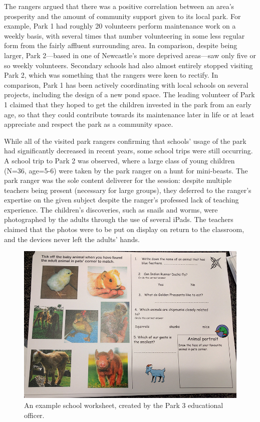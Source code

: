 The rangers argued that there was a positive correlation between an area’s prosperity and the amount of community support given to its local park. For example, Park 1 had roughly 20 volunteers perform maintenance work on a weekly basis, with several times that number volunteering in some less regular form from the fairly affluent surrounding area. In comparison, despite being larger, Park 2---based in one of Newcastle’s more deprived areas---saw only five or so weekly volunteers. Secondary schools had also almost entirely stopped visiting Park 2, which was something that the rangers were keen to rectify. In comparison, Park 1 has been actively coordinating with local schools on several projects, including the design of a new pond space. The leading volunteer of Park 1 claimed that they hoped to get the children invested in the park from an early age, so that they could contribute towards its maintenance later in life or at least appreciate and respect the park as a community space. 

While all of the visited park rangers confirming that schools’ usage of the park had significantly decreased in recent years, some school trips were still occurring. A school trip to Park 2 was observed, where a large class of young children (N=36, age=5-6) were taken by the park ranger on a hunt for mini-beasts. The park ranger was the sole content deliverer for the session: despite multiple teachers being present (necessary for large groups), they deferred to the ranger's expertise on the given subject despite the ranger's professed lack of teaching experience. The children's discoveries, such as snails and worms, were photographed by the adults through the use of several iPads. The teachers claimed that the photos were to be put on display on return to the classroom, and the devices never left the adults' hands.

\begin{figure}
  \centering
  \includegraphics[width=0.8\columnwidth]{images/chapter04/worksheet.jpg}
  \caption[An existing park worksheet]{An example school worksheet, created by the Park 3 educational officer.}
  \label{fig:worksheet}
\end{figure}

